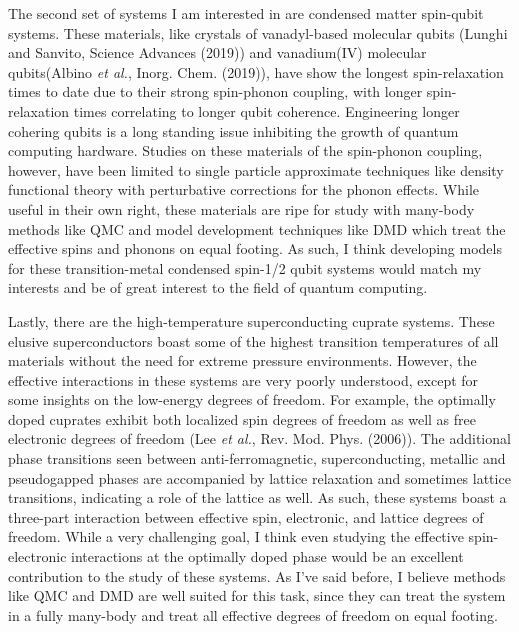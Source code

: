 \documentclass{article}
\begin{document}
The second set of systems I am interested in are condensed matter spin-qubit systems.
These materials, like crystals of vanadyl-based molecular qubits (Lunghi and Sanvito, Science Advances (2019)) and vanadium(IV) molecular qubits(Albino \textit{et al.}, Inorg. Chem. (2019)),  have show the longest spin-relaxation times to date due to their strong spin-phonon coupling, with longer spin-relaxation times correlating to longer qubit coherence.
Engineering longer cohering qubits is a long standing issue inhibiting the growth of quantum computing hardware.
Studies on these materials of the spin-phonon coupling, however, have been limited to single particle approximate techniques like density functional theory with perturbative corrections for the phonon effects.
While useful in their own right, these materials are ripe for study with many-body methods like QMC and model development techniques like DMD which treat the effective spins and phonons on equal footing.
As such, I think developing models for these transition-metal condensed spin-1/2 qubit systems would match my interests and be of great interest to the field of quantum computing.

Lastly, there are the high-temperature superconducting cuprate systems.
These elusive superconductors boast some of the highest transition temperatures of all materials without the need for extreme pressure environments.
However, the effective interactions in these systems are very poorly understood, except for some insights on the low-energy degrees of freedom.
For example, the optimally doped cuprates exhibit both localized spin degrees of freedom as well as free electronic degrees of freedom (Lee \textit{et al.}, Rev. Mod. Phys. (2006)).
The additional phase transitions seen between anti-ferromagnetic, superconducting, metallic and pseudogapped phases are accompanied by lattice relaxation and sometimes lattice transitions, indicating a role of the lattice as well.
As such, these systems boast a three-part interaction between effective spin, electronic, and lattice degrees of freedom.
While a very challenging goal, I think even studying the effective spin-electronic interactions at the optimally doped phase would be an excellent contribution to the study of these systems.
As I've said before, I believe methods like QMC and DMD are well suited for this task, since they can treat the system in a fully many-body and treat all effective degrees of freedom on equal footing.
\end{document}
